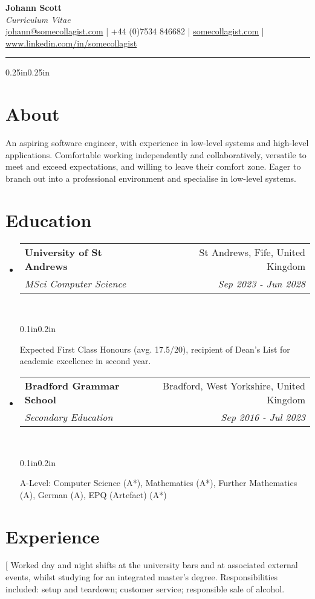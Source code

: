 \documentclass[a4paper]{article}
\makeatletter
\newcommand{\emailaddr}{johann@somecollagist.com}
\newcommand{\phonenumber}{+44 (0)7534 846682}
\newcommand{\website}{somecollagist.com}
\newcommand{\linkedin}{www.linkedin.com/in/somecollagist}
\newcommand{\resumeSubheading}[5][]{
  \vspace{2pt}\item
    \begin{tabular*}{0.875\textwidth}[t]{l@{\extracolsep{\fill}}r}
      \textbf{#2} & #3 \\
      \textit{\small#4} & \textit{\small #5} \\
    \end{tabular*}\\
    \vspace{-5pt}
    \begin{adjustwidth}{0.1in}{0.2in}
      #1
    \end{adjustwidth}
    \vspace{10pt}
}
\newcommand{\resumeSubheadingList}[1]{
  \begin{itemize}
    #1
  \end{itemize}
}
\makeatother
\begin{document}
\begin{center}
  \huge \textbf{Johann Scott} \\
  \normalsize \textit{Curriculum Vitae} \\
  \vspace{1em}
  {
    \href{mailto:\emailaddr}{\emailaddr} {|}
    {\phonenumber} {|}
    \href{https://\website}{\website} {|}
    \href{https://\linkedin}{\linkedin}
  } \\
  \vspace{1em}
  \rule{\linewidth}{1pt}
\end{center}

\begin{adjustwidth}{0.25in}{0.25in}

  \section{About}
  An aspiring software engineer, with experience in low-level systems and
  high-level applications. Comfortable working independently and
  collaboratively, versatile to meet and exceed expectations, and willing to
  leave their comfort zone. Eager to branch out into a professional environment
  and specialise in low-level systems.

  \section{Education}
    \resumeSubheadingList{
      \resumeSubheading[
        Expected First Class Honours (avg. 17.5/20), recipient of Dean's List for academic excellence in second year.
      ]
        {University of St Andrews}
        {St Andrews, Fife, United Kingdom}
        {MSci Computer Science}
        {Sep 2023 {-} Jun 2028}
      \resumeSubheading[
        A-Level: Computer Science (A*), Mathematics (A*), Further
        Mathematics (A), German (A), EPQ (Artefact) (A*)
      ]
        {Bradford Grammar School}
        {Bradford, West Yorkshire, United Kingdom}
        {Secondary Education}
        {Sep 2016 {-} Jul 2023}
    }

  \section{Experience}
    \resumeSubheadingList{
      \resumeSubheading[
        Worked day and night shifts at the university bars and at associated
        external events, whilst studying for an integrated master's degree.
        Responsibilities included: setup and teardown; customer service;
        responsible sale of alcohol.

}
\end{adjustwidth}
\end{document}
